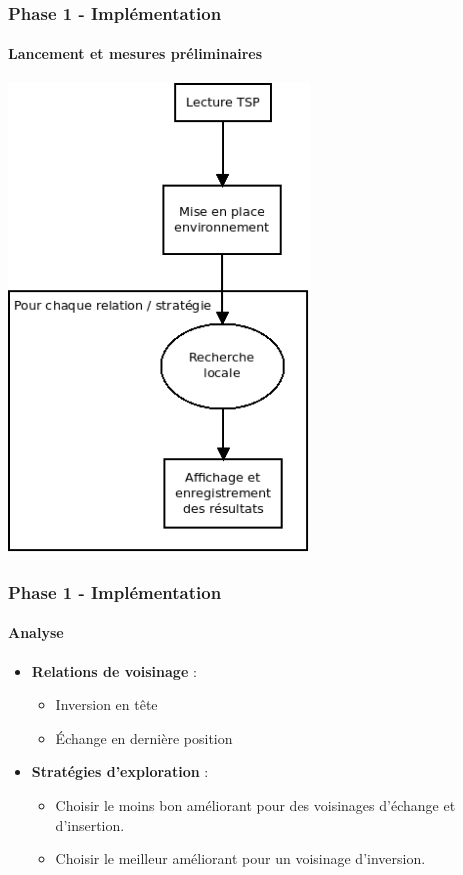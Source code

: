 \documentclass{beamer}
\begin{document}
\begin{frame}
  \frametitle{Phase 1 - Implémentation}
  \framesubtitle{Lancement et mesures préliminaires}
  
  \begin{center}
  \includegraphics[width=0.6\textwidth,height=0.75\textheight]{images/exec-phase-1.png}
  \end{center}
  
\end{frame}

\begin{frame}
  \frametitle{Phase 1 - Implémentation}
  \framesubtitle{Analyse}
  
  \begin{itemize}
    \item \textbf{Relations de voisinage} :
      \begin{itemize}
	\item Inversion en tête
	\item Échange en dernière position
      \end{itemize}
    \item \textbf{Stratégies d'exploration} :
      \begin{itemize}
	\item Choisir le moins bon améliorant pour des voisinages d'échange et
d'insertion.
	\item Choisir le meilleur améliorant pour un voisinage d'inversion.
      \end{itemize}
  \end{itemize}
  
\end{frame}
\end{document}
